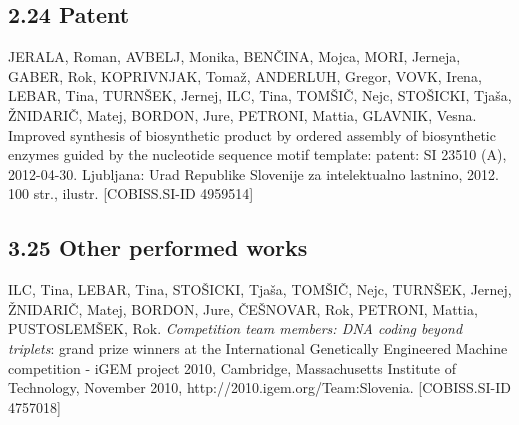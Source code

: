 \subsection*{2.24 Patent}
\begin{bib}[resume]
\item JERALA, Roman, AVBELJ, Monika, BEN\v{C}INA, Mojca, MORI, Jer\-neja, GABER, Rok, KOPRIVNJAK, Toma\v{z}, ANDERLUH, Gregor, VOVK, Irena, LEBAR, Tina, TURN\v{S}EK, Jernej, ILC, Tina, TOM\v{S}I\v{C}, Nejc, STO\v{S}ICKI, Tja\v{s}a, \v{Z}NIDARI\v{C}, Matej, BORDON, Jure, PETRO\-NI, Mattia, GLAVNIK, Vesna. Improved synthesis of biosynthetic product by ordered assembly of biosynthetic enzymes guided by the nucleotide sequence motif template: patent: SI 23510 (A), 2012-04-30. Ljubljana: Urad Republike Slovenije za intelektualno lastnino, 2012. 100 str., ilustr. [COBISS.SI-ID 4959514]
\end{bib}

\subsection*{3.25 Other performed works}
\begin{bib}[resume]
\item  ILC, Tina, LEBAR, Tina, STO\v{S}ICKI, Tja\v{s}a, TOM\-\v{S}I\v{C}, Nejc, TURN\-\v{S}EK, Jernej, \v{Z}NIDARI\v{C}, Matej, BORDON, Jure, \v{C}E\v{S}NOVAR, Rok, PE\-TRO\-NI, Mattia, PUSTOSLEM\v{S}EK, Rok. \emph{Competition team members: DNA coding beyond triplets}: grand prize winners at the International Genetically Engineered Machine competition - iGEM project 2010, Cambridge, Massachusetts Institute of Technology, November 2010, http://2010.igem.org/Team:Slovenia. [COBISS.SI-ID 4757018]
\end{bib}
